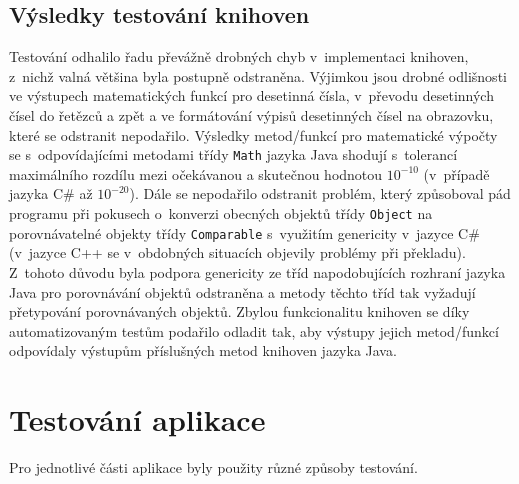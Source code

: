 \documentclass[czech,BP]{thesiskiv}
\begin{document}
\subsection{Výsledky testování knihoven}
Testování odhalilo řadu převážně drobných chyb v~implementaci knihoven, z~nichž valná většina byla postupně odstraněna. Výjimkou jsou drobné odlišnosti ve výstupech matematických funkcí pro desetinná čísla, v~převodu desetinných čísel do řetězců a zpět a ve formátování výpisů desetinných čísel na obrazovku, které se odstranit nepodařilo. Výsledky metod/funkcí pro matematické výpočty se s~odpovídajícími metodami třídy \texttt{Math} jazyka Java shodují s~tolerancí maximálního rozdílu mezi očekávanou a skutečnou hodnotou $10^{-10}$ (v~případě jazyka C\# až $10^{-20}$). Dále se nepodařilo odstranit problém, který způsoboval pád programu při pokusech o~konverzi obecných objektů třídy \texttt{Object} na porovnávatelné objekty třídy \texttt{Comparable} s~využitím genericity v~jazyce C\# (v~jazyce C++ se v~obdobných situacích objevily problémy při překladu). Z~tohoto důvodu byla podpora genericity ze tříd napodobujících rozhraní jazyka Java pro porovnávání objektů odstraněna a metody těchto tříd tak vyžadují přetypování porovnávaných objektů. Zbylou funkcionalitu knihoven se díky automatizovaným testům podařilo odladit tak, aby výstupy jejich metod/funkcí odpovídaly výstupům příslušných metod knihoven jazyka Java.

\section{Testování aplikace}
Pro jednotlivé části aplikace byly použity různé způsoby testování.
\end{document}
